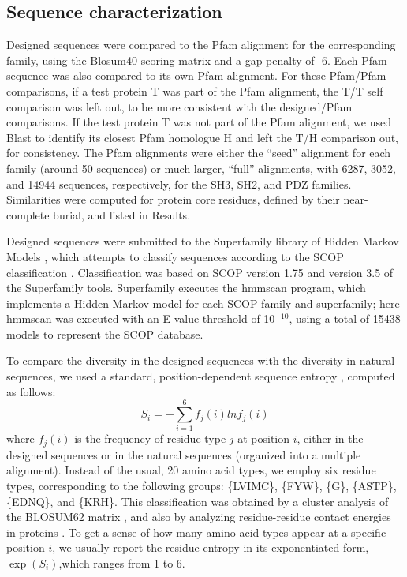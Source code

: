 \subsection{Sequence characterization}
Designed sequences were compared to the Pfam alignment for the corresponding family, using the Blosum40 scoring matrix and a gap penalty of -6. Each Pfam sequence was also compared to its own Pfam alignment. For these Pfam/Pfam comparisons, if a test protein T was part of the Pfam alignment, the T/T self comparison was left out, to be more consistent with the designed/Pfam comparisons. If the test protein T was not part of the Pfam alignment, we used Blast to identify its closest Pfam homologue H and left the T/H comparison out, for consistency. The Pfam alignments were either the ``seed'' alignment for each family (around 50 sequences) or much larger, ``full'' alignments, with 6287, 3052, and 14944 sequences, respectively, for the SH3, SH2, and PDZ families. Similarities were computed for protein core residues, defined by their near-complete burial, and listed in Results.

Designed sequences were submitted to the Superfamily library of Hidden Markov Models \cite{Gough01,Wilson07}, which attempts to classify sequences according to the SCOP classification \cite{Andreeva04}. Classification was based on SCOP version 1.75 and version 3.5 of the Superfamily tools. Superfamily executes the hmmscan program, which implements a Hidden Markov model for each SCOP family and superfamily; here hmmscan was executed with an E-value threshold of 10$^{-10}$, using a total of 15438 models to represent the SCOP database.

To compare the diversity in the designed sequences with the diversity in natural sequences, we used a standard, position-dependent sequence entropy \cite{DurbinBK}, computed as follows:
\begin{equation} \label{eq:entropy}
S_i = - \sum_{i=1}^6 f_j (i) ln f_j (i)
\end{equation}
where $f_j(i)$ is the frequency of residue type $j$ at position $i$, either in the designed sequences or in the natural sequences (organized into a multiple alignment). Instead of the usual, 20 amino acid types, we employ six residue types, corresponding to the following groups: \{LVIMC\}, \{FYW\}, \{G\}, \{ASTP\}, \{EDNQ\}, and \{KRH\}. This classification was obtained by a cluster analysis of the BLOSUM62 matrix \cite{Murphy02}, and also by analyzing residue-residue contact energies in proteins \cite{Launay07}. To get a sense of how many amino acid types appear at a specific position $i$, we usually report the residue entropy in its exponentiated form, $\exp(S_i)$,which ranges from 1 to 6. 

